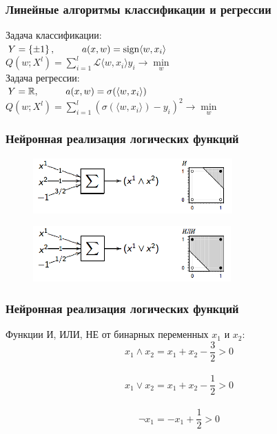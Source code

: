 \documentclass[12pt]{beamer}
\begin{document}
\begin{frame}\frametitle{Линейные алгоритмы классификации и регрессии}
Задача классификации: \\
$Y = \left\{ \pm1 \right\}, \hspace{10mm} a(x,w) = \sign \langle w, x_i \rangle $\\
$Q(w;X^l) = \sum\limits_{i=1}^l \mathcal{L} \langle w, x_i\rangle y_i \rightarrow \min\limits_w$\\
\vspace{5mm}
Задача регрессии:\\
$Y = \mathbb{R}, \hspace{10mm} a(x,w) = \sigma(\langle w, x_i \rangle)$\\
$Q(w;X^l) = \sum\limits_{i=1}^l (\sigma(\langle w, x_i \rangle) - y_i)^2 \rightarrow \min\limits_w $
\end{frame}

\begin{frame}\frametitle{Нейронная реализация логических функций}

\begin{figure}[htbp]
  \includegraphics[height=60pt, keepaspectratio = true]{images/OR}   
\end{figure}

\begin{figure}[htbp]
  \includegraphics[height=60pt, keepaspectratio = true]{images/AND}   
\end{figure}

\end{frame}

\begin{frame}\frametitle{Нейронная реализация логических функций}
Функции И, ИЛИ, НЕ от бинарных переменных $x_1$ и $x_2$:\\
$$x_1 \wedge x_2 = x_1 + x_2 - \frac{3}{2} > 0$$\\
$$x_1 \vee x_2 = x_1 + x_2 - \frac{1}{2} > 0$$\\
$$\neg x_1 = -x_1 + \frac{1}{2}> 0$$
\end{frame}
\end{document}
